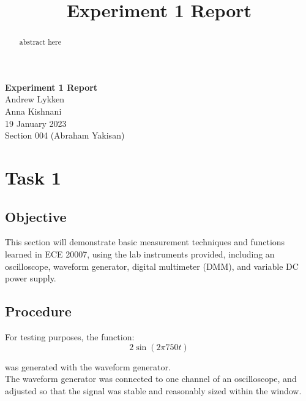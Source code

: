 \documentclass[notitlepage, 12pt]{report}  %
\title{Experiment 1 Report}
\begin{document}


\begin{center}
\large \textbf{Experiment 1 Report} \\ %
\small 
Andrew Lykken\\
Anna Kishnani\\
19 January 2023\\
Section 004 (Abraham Yakisan)\\

\end{center}

\vspace{4in}


\begin{abstract}
abstract here 
\end{abstract}

\newpage

\section*{Task 1} %


\subsection*{Objective}
This section will demonstrate basic measurement techniques and functions learned in ECE 20007, using 
the lab instruments provided, including an oscilloscope, waveform generator, digital multimeter (DMM), 
and variable DC power supply. 

\subsection*{Procedure}
\indent\indent For testing purposes, the function:
\begin{equation}
    2 \sin(2\pi 750t)
\end{equation}

was generated with the waveform generator.\\

The waveform generator was connected to one channel of an oscilloscope, and adjusted so that the signal 
was stable and reasonably sized within the window.\\
\end{document}
